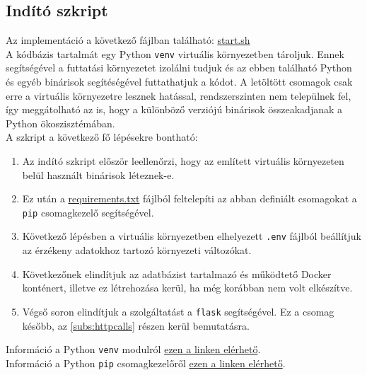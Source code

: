 \documentclass[11pt, a4paper]{article}
\begin{document}
		\subsection{Indító szkript}
			\begin{flushleft}
				\justifying
				Az implementáció a következő fájlban található:
				\color{blue}
				\href{https://github.com/mark182182/GKLB_INTM020_mikroelektromechanikai_rendszerek/blob/main/start.sh}{start.sh}\\
				\color{black}
				A kódbázis tartalmát egy Python \texttt{venv} virtuális környezetben tároljuk. Ennek segítségével a futtatási környezetet izolálni tudjuk és az ebben található Python és egyéb binárisok segítéségével futtathatjuk a kódot. A letöltött csomagok csak erre a virtuális környezetre lesznek hatással, rendszerszinten nem települnek fel, így meggátolható az is, hogy a különböző verziójú binárisok összeakadjanak a Python ökoszisztémában. \\
				A szkript a következő fő lépésekre bontható:
				\begin{enumerate}
					\item Az indító szkript először leellenőrzi, hogy az említett virtuális környezeten belül használt binárisok léteznek-e.
					\item Ez után a
					\color{blue} \href{https://github.com/mark182182/GKLB_INTM020_mikroelektromechanikai_rendszerek/blob/main/requirements.txt}{requirements.txt}
					\color{black} fájlból feltelepíti az abban definiált csomagokat a \texttt{pip} csomagkezelő segítségével.
					\item Következő lépésben a virtuális környezetben elhelyezett \texttt{.env} fájlból beállítjuk az érzékeny adatokhoz tartozó környezeti változókat.
					\item Következőnek elindítjuk az adatbázist tartalmazó és működtető Docker konténert, illetve ez létrehozása kerül, ha még korábban nem volt elkészítve.
					\item Végső soron elindítjuk a szolgáltatást a \texttt{flask} segítségével. Ez a csomag később, az \ref{subs:httpcalls} részen kerül bemutatásra.
				\end{enumerate}
				Információ a Python \texttt{venv} modulról
				\color{blue}
				\href{https://docs.python.org/3/library/venv.html}{ezen a linken elérhető}\color{black}.\\
				Információ a Python \texttt{pip} csomagkezelőről
				\color{blue}
				\href{https://pip.pypa.io/en/stable/user_guide/}{ezen a linken elérhető}\color{black}.
			\end{flushleft}
\end{document}

